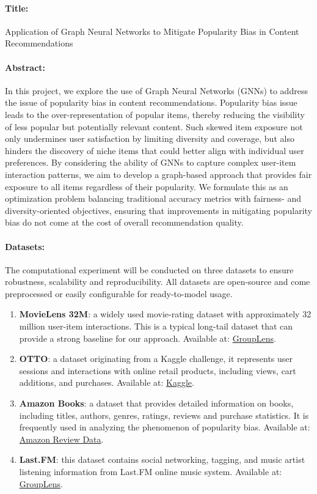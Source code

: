\documentclass[12pt]{article}
\begin{document}
\paragraph{Title:} Application of Graph Neural Networks to Mitigate Popularity Bias in Content Recommendations

\paragraph{Abstract:} In this project, we explore the use of Graph Neural Networks (GNNs) to address the issue of popularity bias in
content recommendations. Popularity bias issue leads to the over-representation of popular items, thereby reducing the visibility of
less popular but potentially relevant content. Such skewed item exposure not only undermines user satisfaction by limiting diversity
and coverage, but also hinders the discovery of niche items that could better align with individual user preferences. By considering
the ability of GNNs to capture complex user-item interaction patterns, we aim to develop a graph-based approach that provides fair
exposure to all items regardless of their popularity. We formulate this as an optimization problem balancing traditional accuracy
metrics with fairness- and diversity-oriented objectives, ensuring that improvements in mitigating popularity bias do not come at the
cost of overall recommendation quality.

\paragraph{Datasets:} The computational experiment will be conducted on three datasets to ensure robustness, scalability and reproducibility.
All datasets are open-source and come preprocessed or easily configurable for ready-to-model usage.
\begin{enumerate}
    \item \textbf{MovieLens 32M}:
    a widely used movie-rating dataset with approximately 32 million user-item interactions.
    This is a typical long-tail dataset that can provide a strong baseline for our approach.
    Available at: \href{https://grouplens.org/datasets/movielens/32m/}{GroupLens}.
    \item \textbf{OTTO}:
    a dataset originating from a Kaggle challenge, it represents user sessions and interactions with online retail products,
    including views, cart additions, and purchases.
    Available at: \href{https://www.kaggle.com/competitions/otto-recommender-system}{Kaggle}.
    \item \textbf{Amazon Books}:
    a dataset that provides detailed information on books, including titles, authors, genres, ratings, reviews and purchase statistics.
    It is frequently used in analyzing the phenomenon of popularity bias.
    Available at: \href{https://nijianmo.github.io/amazon/index.html}{Amazon Review Data}.
    \item \textbf{Last.FM}:
    this dataset contains social networking, tagging, and music artist listening information from Last.FM online music system.
    Available at: \href{https://grouplens.org/datasets/hetrec-2011/}{GroupLens}.
\end{enumerate}
\end{document}
